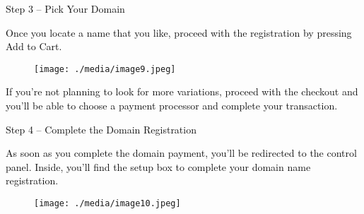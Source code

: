 \documentclass[12pt]{report}
\renewcommand{\_}{\kern-1.5pt\textunderscore\kern-1.5pt}
\begin{document}
\begin{itemize}
\vspace{\baselineskip}
\vspace{\baselineskip}
\vspace{\baselineskip}
\vspace{\baselineskip}
\vspace{\baselineskip} \tabto{0.59in} \textcolor[HTML]{0D0D0D}{Step 3 – Pick Your Domain}\par

\setlength{\parskip}{0.12pt}
 \tabto{0.59in} \textcolor[HTML]{0D0D0D}{Once you locate a name that you like, proceed with the registration by pressing Add to Cart.}\par


\vspace{\baselineskip}


\begin{figure}[H]
	\begin{Center}
		\texttt{[image: ./media/image9.jpeg]}
	\end{Center}
\end{figure}



\par


\vspace{\baselineskip} \tabto{0.59in} \textcolor[HTML]{0D0D0D}{If you’re not planning to look for more variations, proceed with the checkout and you’ll be able to choose a payment processor and complete your transaction.}\par


\vspace{\baselineskip} \tabto{0.59in} \textcolor[HTML]{0D0D0D}{Step 4 – Complete the Domain Registration}\par

 \tabto{0.59in} \textcolor[HTML]{0D0D0D}{As soon as you complete the domain payment, you’ll be redirected to the control panel. Inside, you’ll find the setup box to complete your domain name registration.}\par




\begin{figure}[H]
\advance\leftskip 2.17in		\texttt{[image: ./media/image10.jpeg]}
\end{figure}



\end{itemize}
\end{document}
